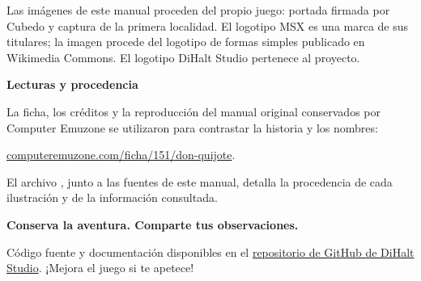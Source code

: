 Las imágenes de este manual proceden del propio juego: portada firmada por Cubedo y captura de la primera localidad. El logotipo MSX es una marca de sus titulares; la imagen procede del logotipo de formas simples publicado en Wikimedia Commons. El logotipo DiHalt Studio pertenece al proyecto.

\textbf{Lecturas y procedencia}\par
La ficha, los créditos y la reproducción del manual original conservados por Computer Emuzone se utilizaron para contrastar la historia y los nombres:\par
\href{https://computeremuzone.com/ficha/151/don-quijote}{computeremuzone.com/ficha/151/don-quijote}.\par
El archivo , junto a las fuentes de este manual, detalla la procedencia de cada ilustración y de la información consultada.

\vfill
\textcolor{accent}{\textbf{Conserva la aventura. Comparte tus observaciones.}}\par
Código fuente y documentación disponibles en el \href{https://github.com/DiHaltStudio/donquijote-msx1-opl4-en-es}{repositorio de GitHub de DiHalt Studio}. ¡Mejora el juego si te apetece!
